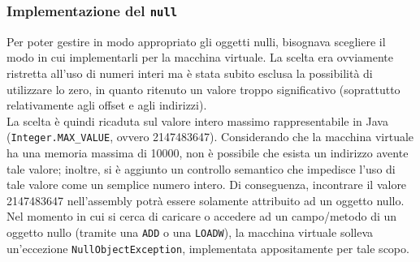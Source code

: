 \documentclass[a4paper]{article}   %
\begin{document}
\subsubsection{Implementazione del \lstinline|null|}
Per poter gestire in modo appropriato gli oggetti nulli, bisognava scegliere il modo in cui implementarli per la macchina virtuale. La scelta era ovviamente ristretta all'uso di numeri interi ma è stata subito esclusa la possibilità di utilizzare lo zero, in quanto ritenuto un valore troppo significativo (soprattutto relativamente agli offset e agli indirizzi).\\
La scelta è quindi ricaduta sul valore intero massimo rappresentabile in Java (\lstinline|Integer.MAX_VALUE|, ovvero 2147483647). Considerando che la macchina virtuale ha una memoria massima di 10000, non è possibile che esista un indirizzo avente tale valore; inoltre, si è aggiunto un controllo semantico che impedisce l'uso di tale valore come un semplice numero intero. Di conseguenza, incontrare il valore 2147483647 nell'assembly potrà essere solamente attribuito ad un oggetto nullo.\\
Nel momento in cui si cerca di caricare o accedere ad un campo/metodo di un oggetto nullo (tramite una \lstinline[language=ANTLR]|ADD| o una \lstinline[language=ANTLR]|LOADW|), la macchina virtuale solleva un'eccezione \lstinline|NullObjectException|, implementata appositamente per tale scopo.
\end{document}
